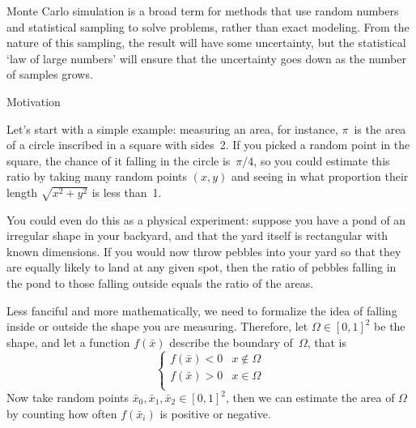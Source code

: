 
Monte Carlo simulation is a broad term for methods that use random
numbers and statistical sampling to solve problems, rather than exact
modeling. From the nature of this sampling, the result will have some
uncertainty, but the statistical `law of large numbers' will ensure
that the uncertainty goes down as the number of samples grows.

 {Motivation}

Let's start with a simple example: measuring an
area, for instance, $\pi$~is the area of a circle inscribed
in a square with sides~2. If you picked a random point in the square,
the chance of it falling in the circle is~$\pi/4$, so you could
estimate this ratio by taking many random points $(x,y)$ and seeing
in what proportion their length $\sqrt{x^2+y^2}$ is less than~1.

You could even do this as a physical experiment:
suppose you have a pond of an irregular shape in your backyard,
and that the yard itself is rectangular with known dimensions. If you
would now throw pebbles into your yard so that they are equally likely
to land at any given spot, then the ratio of pebbles falling in the
pond to those falling outside equals the ratio of the areas. 

Less
fanciful and more mathematically, we need to formalize the idea of
falling inside or outside the shape you are measuring.
Therefore, let $\Omega\in[0,1]^2$ be the shape, and let 
a function $f(\bar x)$ describe
the boundary of~$\Omega$, that is
\[ 
\begin{cases}
  f(\bar x)<0&x\not\in\Omega\\
  f(\bar x)>0&x\in\Omega\\
\end{cases}
\]
Now take random points $\bar x_0,\bar x_1,\bar x_2\in[0,1]^2$, then we
can estimate the area of $\Omega$ by counting how often $f(\bar x_i)$
is positive or negative.

